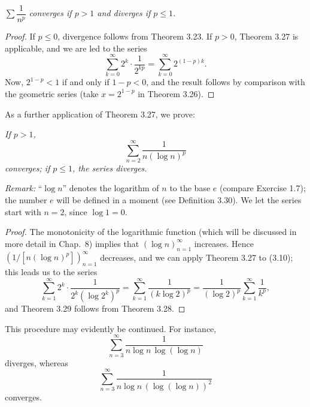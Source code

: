 \emph{$\sum \dfrac{1}{n^p}$ converges if $p > 1$ and diverges if $p \le 1$.}

\begin{proof}
If $p \le 0$, divergence follows from Theorem 3.23. If $p > 0$, Theorem 3.27
is applicable, and we are led to the series
\[ \sum_{k=0}^{\infty} 2^k \cdot \frac{1}{2^{kp}} =
   \sum_{k=0}^{\infty} 2^{(1-p)k}. \]
Now, $2^{1-p} < 1$ if and only if $1 - p < 0$, and the result follows by
comparison with the geometric series (take $x = 2^{1-p}$ in Theorem
3.26).
\end{proof}

As a further application of Theorem 3.27, we prove:

\emph{If $p > 1$,}
\begin{equation}
  \sum_{n=2}^{\infty} \frac{1}{n(\log n)^p} \tag{3.10}
\end{equation}
\emph{converges; if $p \le 1$, the series diverges.}

\emph{Remark:} ``$\log n$'' denotes the logarithm of $n$ to the base $e$
(compare Exercise 1.7); the number $e$ will be defined in a moment (see
Definition 3.30). We let the series start with $n = 2$, since $\log 1 = 0$.

\begin{proof}
The monotonicity of the logarithmic function (which will be discussed in more
detail in Chap.\ 8) implies that $(\log n)_{n=1}^\infty$ increases. Hence
$(1/[n(\log n)^p])_{n=1}^\infty$ decreases, and we can apply Theorem 3.27 to
(3.10); this leads us to the series
\begin{equation}
  \sum_{k=1}^{\infty} 2^k \cdot \frac{1}{2^k(\log 2^k)^p}
  = \sum_{k=1}^{\infty} \frac{1}{(k\log 2)^p}
  = \frac{1}{(\log 2)^p}\sum_{k=1}^{\infty} \frac{1}{k^p}, \tag{3.11}
\end{equation}
and Theorem 3.29 follows from Theorem 3.28.
\end{proof}

This procedure may evidently be continued. For instance,
\begin{equation}
  \sum_{n=3}^{\infty} \frac{1}{n\log n\,\log(\log n)} \tag{3.12}
\end{equation}
diverges, whereas
\begin{equation}
  \sum_{n=3}^{\infty} \frac{1}{n\log n\,(\log(\log n))^2} \tag{3.13}
\end{equation}
converges.

